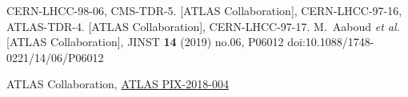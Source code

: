 \begin{thebibliography}{99}
  CERN-LHCC-98-06, CMS-TDR-5.
  [ATLAS Collaboration],
  CERN-LHCC-97-16, ATLAS-TDR-4.
  [ATLAS Collaboration],
  CERN-LHCC-97-17.
  M.~Aaboud {\it et al.} [ATLAS Collaboration],
  JINST {\bf 14} (2019) no.06,  P06012
  doi:10.1088/1748-0221/14/06/P06012

ATLAS Collaboration, \href{https://atlas.web.cern.ch/Atlas/GROUPS/PHYSICS/PLOTS/PIX-2018-004/}{ATLAS PIX-2018-004}

\end{thebibliography}
